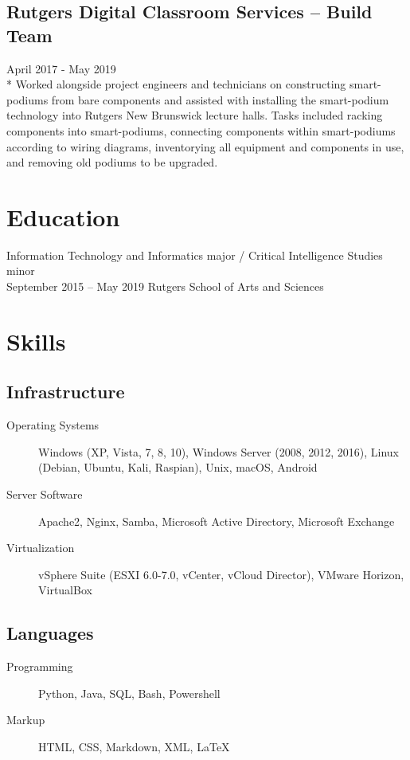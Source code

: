 \documentclass{article}
\begin{document}
\begin{samepage}
\subsection{Rutgers Digital Classroom Services -- Build Team}
April 2017 - May 2019\\*
Worked alongside project engineers and technicians on constructing smart-podiums from bare components and assisted with installing the smart-podium technology into Rutgers New Brunswick lecture halls. Tasks included racking components into smart-podiums, connecting components within smart-podiums according to wiring diagrams, inventorying all equipment and components in use, and removing old podiums to be upgraded.


\section{Education}
Information Technology and Informatics major /
Critical Intelligence Studies minor \\
September 2015 -- May 2019
Rutgers School of Arts and Sciences

\section{Skills}

\subsection{Infrastructure}
\begin{description}
\item[Operating Systems] Windows (XP, Vista, 7, 8, 10), Windows Server (2008, 2012, 2016), Linux (Debian, Ubuntu, Kali, Raspian), Unix,  macOS, Android
\item[Server Software] Apache2, Nginx, Samba, Microsoft Active Directory, Microsoft Exchange
\item[Virtualization] vSphere Suite (ESXI 6.0-7.0, vCenter, vCloud Director), VMware Horizon, VirtualBox
\end{description}

\subsection{Languages}
\begin{description}
\item[Programming] Python, Java, SQL, Bash, Powershell
\item[Markup] HTML, CSS, Markdown, XML, {\LaTeX}
\end{description}


\end{samepage}
\end{document}
